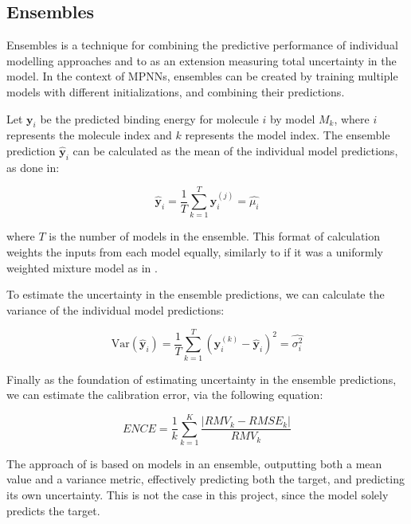 \subsection{Ensembles}

Ensembles is a technique for combining the predictive performance of individual modelling approaches
and to as an extension measuring total uncertainty in the model.
In the context of MPNNs, ensembles can be created by training multiple models with different initializations,
and combining their predictions.

Let $\mathbf{y}_i$ be the predicted binding energy for molecule $i$ by model $M_k$, where $i$ represents the molecule index and $k$
represents the model index. The ensemble prediction $\hat{\mathbf{y}}_i$ can be calculated as the mean of the individual
model predictions, as done in\cite{Tran2019}:

\begin{equation}\label{eq:mean-ensemble}
    \hat{\mathbf{y}}_i = \frac{1}{T} \sum_{k=1}^T \mathbf{y}_i^{(j)} = \hat{\mu_{i}}
\end{equation}

where $T$ is the number of models in the ensemble. This format of calculation weights the inputs from each model equally,
similarly to if it was a uniformly weighted mixture model as in \cite{Busk2021}.

To estimate the uncertainty in the ensemble predictions, we can calculate the variance of the individual model
predictions\cite{Tran2019}:

\begin{equation}\label{eq:variance-ensemble}
    \text{Var}(\hat{\mathbf{y}}_i) = \frac{1}{T} \sum_{k=1}^T (\mathbf{y}_i^{(k)} - \hat{\mathbf{y}}_i)^2 = \hat{\sigma^{2}_{i}}
\end{equation}

Finally as the foundation of estimating uncertainty in the ensemble predictions, we can estimate the calibration error, via the
following equation\cite{Busk2021}:

\begin{equation}\label{eq:calibration-error}
    ENCE = \frac{1}{k} \sum_{k=1}^K \frac{|RMV_{k} - RMSE_{k}|}{RMV_{k}}
\end{equation}

The approach of \cite{Busk2021} is based on models in an ensemble, outputting both a mean value and a variance metric, effectively
predicting both the target, and predicting its own uncertainty. This is not the case in this project, since the model solely predicts
the target.


\newpage